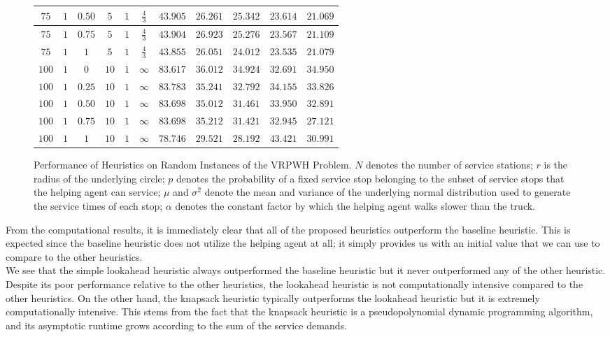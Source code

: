 \documentclass[12pt]{scrartcl}
\begin{document}
\begin{figure}[H]
\begin{longtable}{|c|c|c|c|c|c|c|c|c|c|c|}
 \hline
  $75$ & $1$ & $0.50$ & $5$ & $1$ & $\frac{4}{3}$ &  $43.905$ & $26.261$ & $25.342$ & $23.614$ & $21.069$ \\
 \hline
 $75$ & $1$ & $0.75$ & $5$ & $1$ & $\frac{4}{3}$ & $43.904$ & $26.923$ & $25.276$ & $23.567$ & $21.109$ \\
  \hline
 $75$ & $1$ & $1$ & $5$ & $1$ & $\frac{4}{3}$ & $43.855$ & $26.051$ & $24.012$ & $23.535$ & $21.079$ \\
 \hline
 $100$ & $1$ & $0$ & $10$ & $1$ & $\infty$ & $83.617$ & $36.012$ & $34.924$ & $32.691$ & $34.950$ \\
 \hline
 $100$ & $1$ & $0.25$ & $10$ & $1$ & $\infty$ & $83.783$ & $35.241$ & $32.792$ & $34.155$ & $33.826$ \\
 \hline
 $100$ & $1$ & $0.50$ & $10$ & $1$ & $\infty$ & $83.698$ & $35.012$ & $31.461$ & $33.950$ & $32.891$ \\
 \hline
 $100$ & $1$ & $0.75$ & $10$ & $1$ & $\infty$ & $83.698$ & $35.212$ & $31.421$ & $32.945$ & $27.121$ \\
 \hline
 $100$ & $1$ & $1$ & $10$  & $1$ & $\infty$ & $78.746$ & $29.521$ & $28.192$ & $43.421$ & $30.991$ \\
 \hline
 \end{longtable}  
 \caption{Performance of Heuristics on Random Instances of the VRPWH Problem. $N$ denotes the number of service stations; $r$ is the radius of the underlying circle; $p$ denotes the probability of a fixed service stop belonging to the subset of service stops that the helping agent can service; $\mu$ and $\sigma^2$ denote the mean and variance of the underlying normal distribution used to generate the service times of each stop; $\alpha$ denotes the constant factor by which the helping agent walks slower than the truck.}
\end{figure}

From the computational results, it is immediately clear that all of the proposed heuristics outperform the baseline heuristic. This is expected since the baseline heuristic does not utilize the helping agent at all; it simply provides us with an initial value that we can use to compare to the other heuristics.  \\

We see that the simple lookahead heuristic always outperformed the baseline heuristic but it never outperformed any of the other heuristic. Despite its poor performance relative to the other heuristics, the lookahead heuristic is not computationally intensive compared to the other heuristics. On the other hand, the knapsack heuristic typically outperforms the lookahead heuristic but it is extremely computationally intensive. This stems from the fact that the knapsack heuristic is a pseudopolynomial dynamic programming algorithm, and its asymptotic runtime grows according to the sum of the service demands. \\
\end{document}
